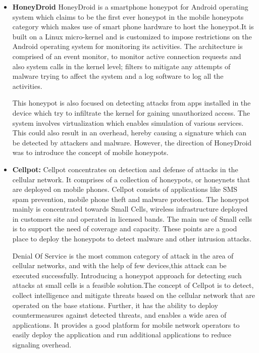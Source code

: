 \documentclass[article,msc=informatik,type=msc,colorback,accentcolor=tud9c]{tudthesis}
\begin{document}
	\begin{itemize}

	\item\textbf{HoneyDroid} HoneyDroid \cite{mulliner2011poster} is a smartphone honeypot for Android operating system which claims to be the first ever honeypot in the mobile honeypots category which makes use of smart phone hardware to host the honeypot.It is built on a Linux micro-kernel and is customized to impose restrictions on the Android operating system for monitoring its activities. The architecture is comprised of an event monitor, to monitor active connection requests and also system calls in the kernel level; filters to mitigate any attempts of malware trying to affect the system and a log software to log all the activities. 
	
	\vspace{3mm}
	This honeypot is also focused on detecting attacks from apps installed in the device which try to infiltrate the kernel for gaining unauthorized access. The system  involves virtualization which enables simulation of various services. 
	This could also result in an overhead, hereby causing a signature which can be detected by attackers and malware. However, the direction of HoneyDroid was to introduce the concept of mobile honeypots. 


	\item\textbf{Cellpot:}  Cellpot \cite{liebergeld2014cellpot} concentrates on detection and defense of attacks in the cellular network. It comprises of a collection of honeypots, or honeynets that are deployed on mobile phones. Cellpot consists of applications like SMS spam prevention, mobile phone theft and malware protection. The honeypot mainly is concentrated towards Small Cells\cite{liebergeld2014cellpot}, wireless infrastructure deployed in customers site and operated in licensed bands. The main use of Small cells is to support the need of coverage and capacity. These points are a good place to deploy the honeypots to detect malware and other intrusion attacks.
	
		\vspace{3mm}
	 Denial Of Service is the most common category of attack in the area of cellular networks, and with the help of few devices,this attack can be executed successfully. Introducing a honeypot approach for detecting such attacks at small cells is a feasible solution.The concept of Cellpot is to detect, collect intelligence and mitigate threats based on the cellular network that are operated on the base stations. Further, it has the ability to 	deploy countermeasures against detected threats, and enables a wide area of applications. It provides a good platform for mobile network operators to easily deploy the application and run additional applications to reduce signaling overhead.


\end{itemize}
\end{document}
